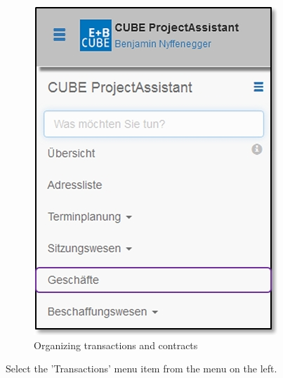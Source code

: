 \begin{figure}   %
  \vspace{-35pt}      %
  \begin{center}
    \includegraphics[width=1\linewidth]{../chapters/06_Geschaefte/pictures/6-1_Menu_Geschaefte.jpg}
  \end{center}
  \vspace{-20pt}
  \caption{Organizing transactions and contracts}
  \vspace{-10pt}
\end{figure}

Select the 'Transactions' menu item from the menu on the left. \\

\vspace{6cm}

\pagebreak

